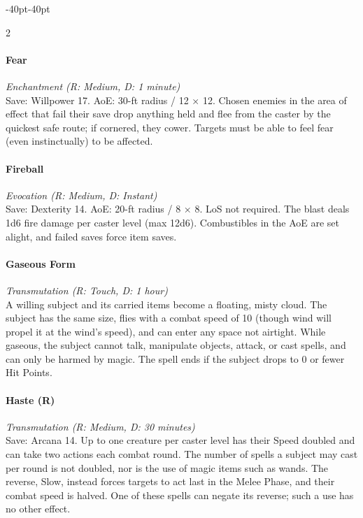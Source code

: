 \documentclass{book}
\begin{document}
\begin{adjustwidth}{-40pt}{-40pt}
\begin{multicols}{2}
\paragraph{Fear}\label{fear}

\emph{Enchantment (R: Medium, D: 1 minute)}\\
Save: Willpower 17. AoE: 30-ft radius / 12 × 12. Chosen enemies in the
area of effect that fail their save drop anything held and flee from the
caster by the quickest safe route; if cornered, they cower. Targets must
be able to feel fear (even instinctually) to be affected.

\paragraph{Fireball}\label{fireball}

\emph{Evocation (R: Medium, D: Instant)}\\
Save: Dexterity 14. AoE: 20-ft radius / 8 × 8. LoS not required. The
blast deals 1d6 fire damage per caster level (max 12d6). Combustibles in
the AoE are set alight, and failed saves force item saves.

\paragraph{Gaseous Form}\label{gaseous-form}

\emph{Transmutation (R: Touch, D: 1 hour)}\\
A willing subject and its carried items become a floating, misty cloud.
The subject has the same size, flies with a combat speed of 10 (though
wind will propel it at the wind's speed), and can enter any space not
airtight. While gaseous, the subject cannot talk, manipulate objects,
attack, or cast spells, and can only be harmed by magic. The spell ends
if the subject drops to 0 or fewer Hit Points.

\paragraph{Haste (R)}\label{haste-r}

\emph{Transmutation (R: Medium, D: 30 minutes)}\\
Save: Arcana 14. Up to one creature per caster level has their Speed
doubled and can take two actions each combat round. The number of spells
a subject may cast per round is not doubled, nor is the use of magic
items such as wands. The reverse, Slow, instead forces targets to act
last in the Melee Phase, and their combat speed is halved. One of these
spells can negate its reverse; such a use has no other effect.


\end{multicols}
\end{adjustwidth}
\end{document}
